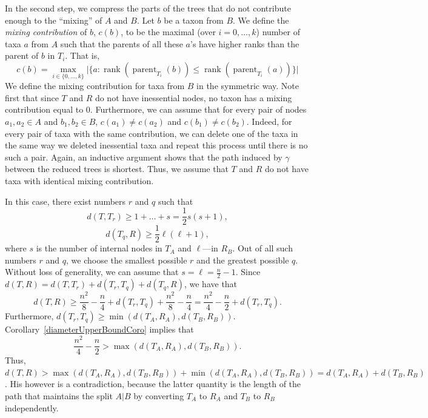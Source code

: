 \documentclass{amsart}
\theoremstyle{definition}
\begin{document}
In the second step, we compress the parts of the trees that do not contribute enough to the ``mixing'' of $A$ and $B$.
Let $b$ be a taxon from $B$.
We define the {\em mixing contribution} of $b$, $c(b)$, to be the maximal (over $i = 0,\ldots,k$) number of taxa $a$ from $A$ such that the parents of all these $a$'s have higher ranks than the parent of $b$ in $T_i$.
That is,
\[
c(b) = \max\limits_{i \in \{0,\ldots,k\}} \Big| \big\{a : \operatorname{rank}(\operatorname{parent}_{T_i}(b)) \le \operatorname{rank}(\operatorname{parent}_{T_i}(a))\big\} \Big|
\]
We define the mixing contribution for taxa from $B$ in the symmetric way.
Note first that since $T$ and $R$ do not have inessential nodes, no taxon has a mixing contribution equal to $0$.
Furthermore, we can assume that for every pair of nodes $a_1,a_2 \in A$ and $b_1,b_2 \in B$, $c(a_1) \ne c(a_2)$ and $c(b_1) \ne c(b_2)$.
Indeed, for every pair of taxa with the same contribution, we can delete one of the taxa in the same way we deleted inessential taxa and repeat this process until there is no such a pair.
Again, an inductive argument shows that the path induced by $\gamma$ between the reduced trees is shortest.
Thus, we assume that $T$ and $R$ do not have taxa with identical mixing contribution.

In this case, there exist numbers $r$ and $q$ such that
\[
d(T, T_r) \ge 1 + \ldots + s = \frac 12 s (s+1),
\]
\[
d(T_q, R) \ge \frac 12 \ell (\ell + 1),
\]
where $s$ is the number of internal nodes in $T_A$ and $\ell$---in $R_B$.
Out of all such numbers $r$ and $q$, we choose the smallest possible $r$ and the greatest possible $q$.
Without loss of generality, we can assume that $s = \ell = \frac n2 - 1$.
Since $d(T,R) = d(T,T_r) + d(T_r,T_q) + d(T_q,R)$, we have that
\[
d(T,R) \ge \frac{n^2}{8} - \frac n4 + d(T_r, T_q) + \frac{n^2}{8} - \frac n4 = \frac{n^2}{4} - \frac n2 + d(T_r, T_q).
\]
Furthermore, $d(T_r, T_q) \ge \min(d(T_A, R_A), d(T_B, R_B))$.
Corollary~\ref{diameterUpperBoundCoro} implies that
\[
\frac{n^2}{4} - \frac n2 > \max(d(T_A, R_A), d(T_B, R_B)).
\]
Thus, $d(T, R) > \max(d(T_A, R_A), d(T_B, R_B)) + \min(d(T_A, R_A), d(T_B, R_B)) = d(T_A, R_A) + d(T_B, R_B)$.
His however is a contradiction, because the latter quantity is the length of the path that maintains the split $A|B$ by converting $T_A$ to $R_A$ and $T_B$ to $R_B$ independently.
\end{document}
